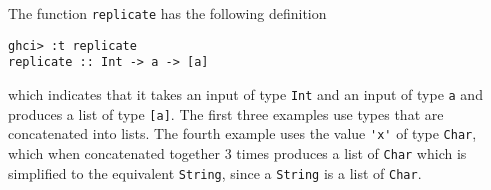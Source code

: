
The function \verb|replicate| has the following definition
\begin{verbatim}
ghci> :t replicate
replicate :: Int -> a -> [a]
\end{verbatim}
which indicates that it takes an input of type \verb|Int| and an input of type 
\verb|a| and produces a list of type \verb|[a]|. The first three examples use
types that are concatenated into lists. The fourth example uses the value
\verb|'x'| of type \verb|Char|, which when concatenated together 3 times produces
a list of \verb|Char| which is simplified to the equivalent \verb|String|, since
a \verb|String| is a list of \verb|Char|.
